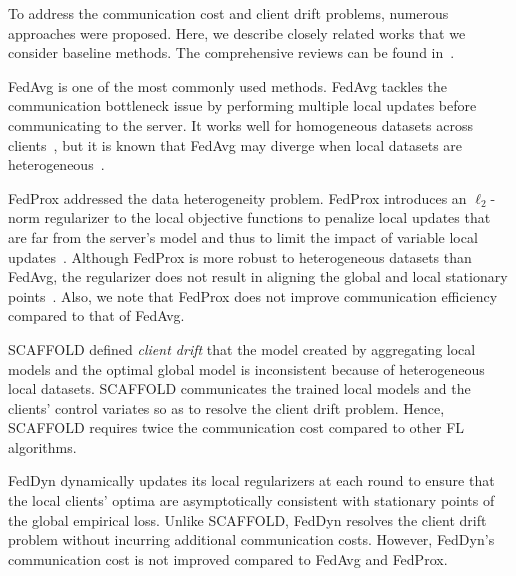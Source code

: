 \documentclass{article} %
\begin{document}
To address the communication cost and client drift problems, numerous approaches were proposed. Here, we describe closely related works that we consider baseline methods. The comprehensive reviews can be found in~\citet{Kairouz2021advances,Li2020federatedlearning}. 

FedAvg \citep{McMahan2017communication} is one of the most commonly used methods. FedAvg tackles the communication bottleneck issue by performing multiple local updates before communicating to the server. It works well for homogeneous datasets across clients~\citep{McMahan2017communication,Karimireddy2020scaffold}, but it is known that FedAvg may diverge when local datasets are heterogeneous~\citep{Zhao2018federated,Li2020federatedlearning}.

FedProx \citep{Li2020federated} addressed the data heterogeneity problem. FedProx introduces an $\ell_2$-norm regularizer to the local objective functions to penalize local updates that are far from the server's model and thus to limit the impact of variable local updates~\citep{Li2020federated}. Although FedProx is more robust to heterogeneous datasets than FedAvg, the regularizer does not result in aligning the global and local stationary points~\citep{Acar2021federated}. Also, we note that FedProx does not improve communication efficiency compared to that of FedAvg. 

SCAFFOLD \citep{Karimireddy2020scaffold} defined \emph{client drift} that the model created by aggregating local models and the optimal global model is inconsistent because of heterogeneous local datasets. SCAFFOLD communicates the trained local models and the clients' control variates so as to resolve the client drift problem. Hence, SCAFFOLD requires twice the communication cost compared to other FL algorithms.

FedDyn \citep{Acar2021federated} dynamically updates its local regularizers at each round to ensure that the local clients' optima are asymptotically consistent with stationary points of the global empirical loss. Unlike SCAFFOLD, FedDyn resolves the client drift problem without incurring additional communication costs. However, FedDyn's communication cost is not improved compared to FedAvg and FedProx.
\end{document}
